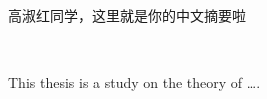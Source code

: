 
\begin{cnabstract}
高淑红同学，这里就是你的中文摘要啦

\end{cnabstract}
\vfill
{}\\[14pt]


\begin{enabstract}
This thesis is a study on the theory of \dots.

\end{enabstract}
\vfill
{}\\[14pt]